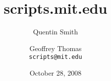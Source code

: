 \documentclass{beamer}
\title{scripts.mit.edu}
\author{Quentin Smith \and Geoffrey Thomas \\ \texttt{scripts@mit.edu}}
\institute{Student Information Processing Board}
\date{October 28, 2008}
\begin{document}
\begin{frame}
    \titlepage
\end{frame}














\end{document}
